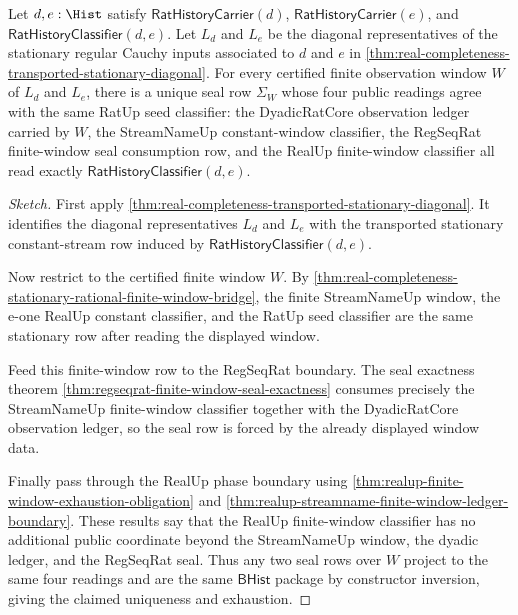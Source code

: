 \begin{theorem}
\label{thm:real-completeness-transported-stationary-window-seal-exhaustion}
Let $d,e:\Hist$ satisfy $\mathsf{RatHistoryCarrier}(d)$,
$\mathsf{RatHistoryCarrier}(e)$, and
$\mathsf{RatHistoryClassifier}(d,e)$. Let $L_d$ and $L_e$ be the diagonal
representatives of the stationary regular Cauchy inputs associated to $d$ and
$e$ in \autoref{thm:real-completeness-transported-stationary-diagonal}. For
every certified finite observation window $W$ of $L_d$ and $L_e$, there is a
unique seal row $\Sigma_W$ whose four public readings agree with the same
RatUp seed classifier:
the DyadicRatCore observation ledger carried by $W$, the StreamNameUp
constant-window classifier, the RegSeqRat finite-window seal consumption row,
and the RealUp finite-window classifier all read exactly
$\mathsf{RatHistoryClassifier}(d,e)$.
\end{theorem}

\begin{proof}[Sketch]
First apply
\autoref{thm:real-completeness-transported-stationary-diagonal}. It identifies
the diagonal representatives $L_d$ and $L_e$ with the transported stationary
constant-stream row induced by $\mathsf{RatHistoryClassifier}(d,e)$.

Now restrict to the certified finite window $W$. By
\autoref{thm:real-completeness-stationary-rational-finite-window-bridge}, the
finite StreamNameUp window, the e-one RealUp constant classifier, and the
RatUp seed classifier are the same stationary row after reading the displayed
window.

Feed this finite-window row to the RegSeqRat boundary. The seal exactness
theorem \autoref{thm:regseqrat-finite-window-seal-exactness} consumes precisely
the StreamNameUp finite-window classifier together with the DyadicRatCore
observation ledger, so the seal row is forced by the already displayed window
data.

Finally pass through the RealUp phase boundary using
\autoref{thm:realup-finite-window-exhaustion-obligation} and
\autoref{thm:realup-streamname-finite-window-ledger-boundary}. These results
say that the RealUp finite-window classifier has no additional public
coordinate beyond the StreamNameUp window, the dyadic ledger, and the RegSeqRat
seal. Thus any two seal rows over $W$ project to the same four readings and
are the same $\mathsf{BHist}$ package by constructor inversion, giving the
claimed uniqueness and exhaustion.
\end{proof}

